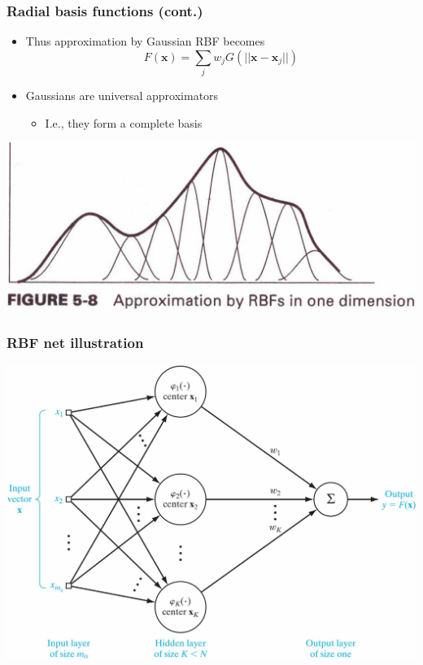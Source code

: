\documentclass[12pt,notes,mathserif]{beamer}
\begin{document}
\begin{frame}[c]
	\frametitle{Radial basis functions (cont.)}
	\begin{itemize}
		\item Thus approximation by Gaussian RBF becomes
		      \[
			      F(\mathbf{x})=\sum_jw_jG(||\mathbf{x}-\mathbf{x}_j||)
		      \]
		\item Gaussians are universal approximators
		      \begin{itemize}
			      \item I.e., they form a complete basis
		      \end{itemize}
	\end{itemize}
	\begin{center}
		\includegraphics[width=0.99\linewidth]{fig/lec711.jpg}
	\end{center}
\end{frame}

\begin{frame}[c]
	\frametitle{RBF net illustration}
	\begin{center}
		\includegraphics[width=0.99\linewidth]{fig/lec712.jpg}
	\end{center}
\end{frame}
\end{document}
